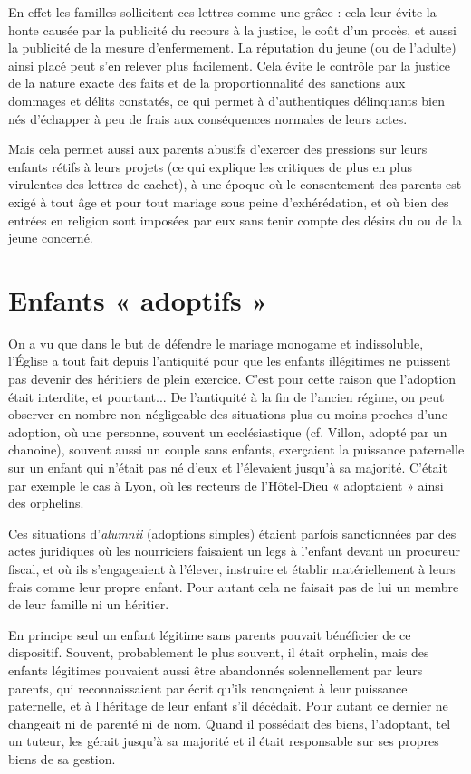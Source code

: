  En effet les familles sollicitent ces lettres comme une grâce : cela leur évite la honte causée par la publicité du recours à la justice, le coût d'un procès, et aussi la publicité de la mesure d'enfermement. La réputation du jeune (ou de l'adulte) ainsi placé peut s'en relever plus facilement. Cela évite le contrôle par la justice de la nature exacte des faits et de la proportionnalité des sanctions aux dommages et délits constatés, ce qui permet à d'authentiques délinquants bien nés d'échapper à peu de frais aux conséquences normales de leurs actes. 

 Mais cela permet aussi aux parents abusifs d'exercer des pressions sur leurs enfants rétifs à leurs projets (ce qui explique les critiques de plus en plus virulentes des lettres de cachet), à une époque où le consentement des parents est exigé à tout âge et pour tout mariage sous peine d'exhérédation, et où bien des entrées en religion sont imposées par eux sans tenir compte des désirs du ou de la jeune concerné. 

\section{Enfants « adoptifs »}

 On a vu que dans le but de défendre le mariage monogame et indissoluble, l'Église a tout fait depuis l'antiquité pour que les enfants illégitimes ne puissent pas devenir des héritiers de plein exercice. C'est pour cette raison que l'adoption était interdite, et pourtant... De l'antiquité à la fin de l'ancien régime, on peut observer en nombre non négligeable des situations plus ou moins proches d'une adoption, où une personne, souvent un ecclésiastique (cf. \hbox{Villon}, adopté par un chanoine), souvent aussi un couple sans enfants, exerçaient la puissance paternelle sur un enfant qui n'était pas né d'eux et l'élevaient jusqu'à sa majorité. C'était par exemple le cas à Lyon, où les recteurs de l'Hôtel-Dieu « adoptaient » ainsi des orphelins. 

 Ces situations d'\emph{alumnii} (adoptions simples) étaient parfois sanctionnées par des actes juridiques où les nourriciers faisaient un legs à l'enfant devant un procureur fiscal, et où ils s'engageaient à l'élever, instruire et établir matériellement à leurs frais comme leur propre enfant. Pour autant cela ne faisait pas de lui un membre de leur famille ni un héritier. 

 En principe seul un enfant légitime sans parents pouvait bénéficier de ce dispositif. Souvent, probablement le plus souvent, il était orphelin, mais des enfants légitimes pouvaient aussi être abandonnés solennellement par leurs parents, qui reconnaissaient par écrit qu'ils renonçaient à leur puissance paternelle, et à l'héritage de leur enfant s'il décédait. Pour autant ce dernier ne changeait ni de parenté ni de nom. Quand il possédait des biens, l'adoptant, tel un tuteur, les gérait jusqu'à sa majorité et il était responsable sur ses propres biens de sa gestion. 

